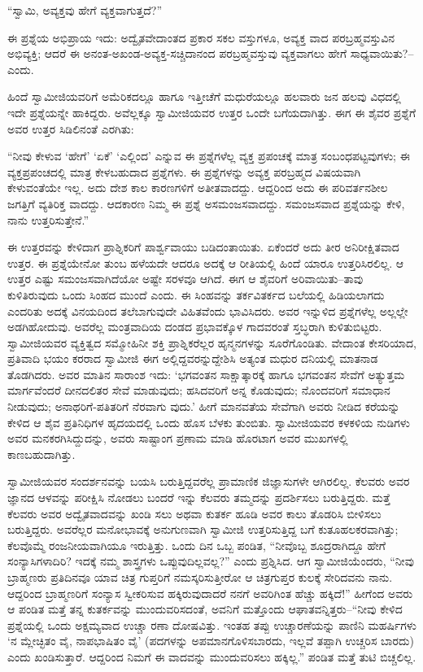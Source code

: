“ಸ್ವಾಮಿ, ಅವ್ಯಕ್ತವು ಹೇಗೆ ವ್ಯಕ್ತವಾಗುತ್ತದೆ?”

ಈ ಪ್ರಶ್ನೆಯ ಅಭಿಪ್ರಾಯ ಇದು: ಅದ್ವೈತವೇದಾಂತದ ಪ್ರಕಾರ ಸಕಲ ವಸ್ತುಗಳೂ, ಅವ್ಯಕ್ತ ವಾದ ಪರಬ್ರಹ್ಮವಸ್ತುವಿನ ಅಭಿವ್ಯಕ್ತಿ; ಆದರೆ ಈ ಅನಂತ-ಅಖಂಡ-ಅವ್ಯಕ್ತ-ಸಚ್ಚಿದಾನಂದ ಪರಬ್ರಹ್ಮವಸ್ತುವು ವ್ಯಕ್ತವಾಗಲು ಹೇಗೆ ಸಾಧ್ಯವಾಯಿತು?–ಎಂದು.

ಹಿಂದೆ ಸ್ವಾಮೀಜಿಯವರಿಗೆ ಅಮೆರಿಕದಲ್ಲೂ ಹಾಗೂ ಇತ್ತೀಚೆಗೆ ಮಧುರೆಯಲ್ಲೂ ಹಲವಾರು ಜನ ಹಲವು ವಿಧದಲ್ಲಿ ಇದೇ ಪ್ರಶ್ನೆಯನ್ನೇ ಹಾಕಿದ್ದರು. ಅವೆಲ್ಲಕ್ಕೂ ಸ್ವಾಮೀಜಿಯವರ ಉತ್ತರ ಒಂದೇ ಬಗೆಯದಾಗಿತ್ತು. ಈಗ ಈ ಶೈವರ ಪ್ರಶ್ನೆಗೆ ಅವರ ಉತ್ತರ ಸಿಡಿಲಿನಂತೆ ಎರಗಿತು:

“ನೀವು ಕೇಳುವ ‘ಹೇಗೆ’ ‘ಏಕೆ’ ‘ಎಲ್ಲಿಂದ’ ಎನ್ನುವ ಈ ಪ್ರಶ್ನೆಗಳೆಲ್ಲ ವ್ಯಕ್ತ ಪ್ರಪಂಚಕ್ಕೆ ಮಾತ್ರ ಸಂಬಂಧಪಟ್ಟವುಗಳು; ಈ ವ್ಯಕ್ತಪ್ರಪಂಚದಲ್ಲಿ ಮಾತ್ರ ಕೇಳಬಹುದಾದ ಪ್ರಶ್ನೆಗಳು. ಈ ಪ್ರಶ್ನೆಗಳನ್ನು ಅವ್ಯಕ್ತ ಪರಬ್ರಹ್ಮದ ವಿಷಯವಾಗಿ ಕೇಳುವಂತೆಯೇ ಇಲ್ಲ. ಅದು ದೇಶ ಕಾಲ ಕಾರಣಗಳಿಗೆ ಅತೀತವಾದದ್ದು. ಆದ್ದರಿಂದ ಅದು ಈ ಪರಿವರ್ತನಶೀಲ ಜಗತ್ತಿಗೆ ವ್ಯತಿರಿಕ್ತ ವಾದದ್ದು. ಆದಕಾರಣ ನಿಮ್ಮ ಈ ಪ್ರಶ್ನೆ ಅಸಮಂಜಸವಾದದ್ದು. ಸಮಂಜಸವಾದ ಪ್ರಶ್ನೆಯನ್ನು ಕೇಳಿ, ನಾನು ಉತ್ತರಿಸುತ್ತೇನೆ.”

ಈ ಉತ್ತರವನ್ನು ಕೇಳಿದಾಗ ಪ್ರಾಶ್ನಿಕರಿಗೆ ಪಾರ್ಶ್ವವಾಯು ಬಡಿದಂತಾಯಿತು. ಏಕೆಂದರೆ ಅದು ತೀರ ಅನಿರೀಕ್ಷಿತವಾದ ಉತ್ತರ. ಈ ಪ್ರಶ್ನೆಯೇನೋ ತುಂಬ ಹಳೆಯದೇ ಆದರೂ ಅದಕ್ಕೆ ಆ ರೀತಿಯಲ್ಲಿ ಹಿಂದೆ ಯಾರೂ ಉತ್ತರಿಸಿರಲಿಲ್ಲ. ಆ ಉತ್ತರ ಎಷ್ಟು ಸಮಂಜಸವಾಗಿದೆಯೋ ಅಷ್ಟೇ ಸರಳವೂ ಆಗಿದೆ. ಈಗ ಆ ಶೈವರಿಗೆ ಅರಿವಾಯಿತು–ತಾವು ಕುಳಿತಿರುವುದು ಒಂದು ಸಿಂಹದ ಮುಂದೆ ಎಂದು. ಈ ಸಿಂಹವನ್ನು ತರ್ಕವಿತರ್ಕದ ಬಲೆಯಲ್ಲಿ ಹಿಡಿಯಲಾಗದು ಎಂದರಿತು ಅದಕ್ಕೆ ವಿನಯದಿಂದ ತಲೆಬಾಗುವುದೇ ವಿಹಿತವೆಂದು ಭಾವಿಸಿದರು. ಅವರ ಇನ್ನುಳಿದ ಪ್ರಶ್ನೆಗಳೆಲ್ಲ ಅಲ್ಲಲ್ಲೇ ಅಡಗಿಹೋದುವು. ಅವರೆಲ್ಲ ಮಂತ್ರವಾದಿಯ ದಂಡದ ಪ್ರಭಾವಕ್ಕೊಳ ಗಾದವರಂತೆ ಸ್ತಬ್ಧರಾಗಿ ಕುಳಿತುಬಿಟ್ಟರು. ಸ್ವಾಮೀಜಿಯವರ ವ್ಯಕ್ತಿತ್ವದ ಸಮ್ಮೋಹಿನೀ ಶಕ್ತಿ ಪ್ರಾಶ್ನಿಕರೆಲ್ಲರ ಹೃನ್ಮನಗಳನ್ನು ಸೂರೆಗೊಂಡಿತು. ವೇದಾಂತ ಕೇಸರಿಯಾದ, ಪ್ರತಿವಾದಿ ಭಯಂ ಕರರಾದ ಸ್ವಾಮೀಜಿ ಈಗ ಅಲ್ಲಿದ್ದವರನ್ನುದ್ದೇಶಿಸಿ ಅತ್ಯಂತ ಮಧುರ ದನಿಯಲ್ಲಿ ಮಾತನಾಡ ತೊಡಗಿದರು. ಅವರ ಮಾತಿನ ಸಾರಾಂಶ ಇದು: ‘ಭಗವಂತನ ಸಾಕ್ಷಾತ್ಕಾರಕ್ಕೆ ಹಾಗೂ ಭಗವಂತನ ಸೇವೆಗೆ ಅತ್ಯುತ್ತಮ ಮಾರ್ಗವೆಂದರೆ ದೀನದಲಿತರ ಸೇವೆ ಮಾಡುವುದು; ಹಸಿದವರಿಗೆ ಅನ್ನ ಕೊಡುವುದು; ನೊಂದವರಿಗೆ ಸಮಾಧಾನ ನೀಡುವುದು; ಅನಾಥರಿಗೆ-ಪತಿತರಿಗೆ ನೆರವಾಗು ವುದು.’ ಹೀಗೆ ಮಾನವತೆಯ ಸೇವೆಗಾಗಿ ಅವರು ನೀಡಿದ ಕರೆಯನ್ನು ಕೇಳಿದ ಆ ಶೈವ ಪ್ರತಿನಿಧಿಗಳ ಹೃದಯದಲ್ಲಿ ಒಂದು ಹೊಸ ಬೆಳಕು ತುಂಬಿತು. ಸ್ವಾಮೀಜಿಯವರ ಕಳಕಳಿಯ ನುಡಿಗಳು ಅವರ ಮನಕರಗಿಸಿದ್ದುದನ್ನು, ಅವರು ಸಾಷ್ಟಾಂಗ ಪ್ರಣಾಮ ಮಾಡಿ ಹೊರಟಾಗ ಅವರ ಮುಖಗಳಲ್ಲಿ ಕಾಣಬಹುದಾಗಿತ್ತು.

ಸ್ವಾಮೀಜಿಯವರ ಸಂದರ್ಶನವನ್ನು ಬಯಸಿ ಬರುತ್ತಿದ್ದವರೆಲ್ಲ ಪ್ರಾಮಾಣಿಕ ಜಿಜ್ಞಾಸುಗಳೇ ಆಗಿರಲಿಲ್ಲ. ಕೆಲವರು ಅವರ ಜ್ಞಾನದ ಆಳವನ್ನು ಪರೀಕ್ಷಿಸಿ ನೋಡಲು ಬಂದರೆ ಇನ್ನು ಕೆಲವರು ತಮ್ಮದನ್ನು ಪ್ರದರ್ಶಿಸಲು ಬರುತ್ತಿದ್ದರು. ಮತ್ತೆ ಕೆಲವರು ಅವರ ಅದ್ವೈತವಾದವನ್ನು ಖಂಡಿ ಸಲು ಅಥವಾ ಕುತರ್ಕ ಹೂಡಿ ಅವರ ಕಾಲು ತೊಡರಿಸಿ ಬೀಳಿಸಲು ಬರುತ್ತಿದ್ದರು. ಅವರೆಲ್ಲರ ಮನೋಭಾವಕ್ಕೆ ಅನುಗುಣವಾಗಿ ಸ್ವಾಮೀಜಿ ಉತ್ತರಿಸುತ್ತಿದ್ದ ಬಗೆ ಕುತೂಹಲಕರವಾಗಿತ್ತು; ಕೆಲವೊಮ್ಮೆ ರಂಜನೀಯವಾಗಿಯೂ ಇರುತ್ತಿತ್ತು. ಒಂದು ದಿನ ಒಬ್ಬ ಪಂಡಿತ, “ನೀವೊಬ್ಬ ಶೂದ್ರರಾಗಿದ್ದೂ ಹೇಗೆ ಸಂನ್ಯಾಸಿಗಳಾದಿರಿ? ಇದಕ್ಕೆ ನಮ್ಮ ಶಾಸ್ತ್ರಗಳು ಒಪ್ಪುವುದಿಲ್ಲವಲ್ಲ?” ಎಂದು ಪ್ರಶ್ನಿಸಿದ. ಆಗ ಸ್ವಾಮೀಜಿಯೆಂದರು, “ನೀವು ಬ್ರಾಹ್ಮಣರು ಪ್ರತಿದಿನವೂ ಯಾವ ಚಿತ್ರ ಗುಪ್ತರಿಗೆ ನಮಸ್ಕರಿಸುತ್ತೀರೋ ಆ ಚಿತ್ರಗುಪ್ತರ ಕುಲಕ್ಕೆ ಸೇರಿದವನು ನಾನು. ಆದ್ದರಿಂದ ಬ್ರಾಹ್ಮಣರಿಗೆ ಸಂನ್ಯಾಸ ಸ್ವೀಕರಿಸುವ ಹಕ್ಕಿರುವುದಾದರೆ ನನಗೆ ಅವರಿಗಿಂತ ಹೆಚ್ಚು ಹಕ್ಕಿದೆ!” ಹೀಗೆಂದ ಅವರು ಆ ಪಂಡಿತ ಮತ್ತೆ ತನ್ನ ಕುತರ್ಕವನ್ನು ಮುಂದುವರಿಸದಂತೆ, ಅವನಿಗೆ ಮತ್ತೊಂದು ಆಘಾತವನ್ನಿತ್ತರು–“ನೀವು ಕೇಳಿದ ಪ್ರಶ್ನೆಯಲ್ಲಿ ಒಂದು ಅಕ್ಷಮ್ಯವಾದ ಉಚ್ಚಾ ರಣಾ ದೋಷವಿತ್ತು. ಇಂತಹ ತಪ್ಪು ಉಚ್ಚಾರಣೆಯನ್ನು ಪಾಣಿನಿ ಮಹರ್ಷಿಗಳು ‘ನ ಮ್ಲೇಚ್ಛಿತಂ ವೈ, ನಾಪಭಾಷಿತಂ ವೈ’ (ಪದಗಳನ್ನು ಅಪಮಾನಗೊಳಿಸಬಾರದು, ಇಲ್ಲವೆ ತಪ್ಪಾಗಿ ಉಚ್ಚರಿಸ ಬಾರದು) ಎಂದು ಖಂಡಿಸುತ್ತಾರೆ. ಆದ್ದರಿಂದ ನಿಮಗೆ ಈ ವಾದವನ್ನು ಮುಂದುವರಿಸಲು ಹಕ್ಕಿಲ್ಲ.” ಪಂಡಿತ ಮತ್ತೆ ತುಟಿ ಬಿಚ್ಚಲಿಲ್ಲ.

